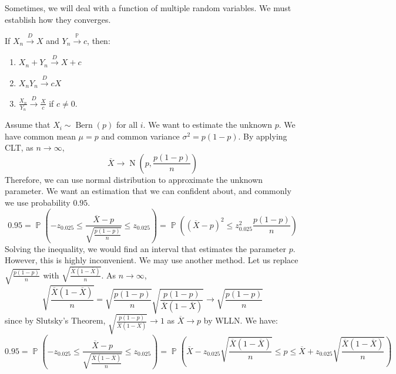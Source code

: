 \documentclass{huhtakm-template-book-v2}
\DeclareMathOperator{\prob}{\mathbb{P}}
\DeclareMathOperator{\Bern}{Bern}
\DeclareMathOperator{\N}{N}
\begin{document}
\newpage
Sometimes, we will deal with a function of multiple random variables. We must establish how they converges.
\begin{thm}
	If $X_{n}\xrightarrow{D}X$ and $Y_{n}\xrightarrow{\prob}c$, then:
	\begin{enumerate}
		\item $X_{n}+Y_{n}\xrightarrow{D}X+c$
		\item $X_{n}Y_{n}\xrightarrow{D}cX$
		\item $\frac{X_{n}}{Y_{n}}\xrightarrow{D}\frac{X}{c}$ if $c\neq 0$.
	\end{enumerate}
\end{thm}
\begin{eg}
	Assume that $X_{i}\sim\Bern(p)$ for all $i$. We want to estimate the unknown $p$. We have common mean $\mu=p$ and common variance $\sigma^{2}=p(1-p)$. By applying CLT, as $n\to\infty$,
	\begin{equation*}
		\overline{X}\to\N\left(p,\frac{p(1-p)}{n}\right)
	\end{equation*}
	Therefore, we can use normal distribution to approximate the unknown parameter. We want an estimation that we can confident about, and commonly we use probability $0.95$.
	\begin{equation*}
		0.95=\prob\left(-z_{0.025}\leq\frac{\overline{X}-p}{\sqrt{\frac{p(1-p)}{n}}}\leq z_{0.025}\right)=\prob\left((\overline{X}-p)^{2}\leq z_{0.025}^{2}\frac{p(1-p)}{n}\right)
	\end{equation*} 
	Solving the inequality, we would find an interval that estimates the parameter $p$. However, this is highly inconvenient. We may use another method. Let us replace $\sqrt{\frac{p(1-p)}{n}}$ with $\sqrt{\frac{\overline{X}(1-\overline{X})}{n}}$. As $n\to\infty$,
	\begin{equation*}
		\sqrt{\frac{\overline{X}(1-\overline{X})}{n}}=\sqrt{\frac{p(1-p)}{n}}\sqrt{\frac{p(1-p)}{\overline{X}(1-\overline{X})}}\to\sqrt{\frac{p(1-p)}{n}}
	\end{equation*}
	since by Slutsky's Theorem, $\sqrt{\frac{p(1-p)}{\overline{X}(1-\overline{X})}}\to 1$ as $\overline{X}\to p$ by WLLN. We have:
	\begin{equation*}
		0.95=\prob\left(-z_{0.025}\leq\frac{\overline{X}-p}{\sqrt{\frac{\overline{X}(1-\overline{X})}{n}}}\leq z_{0.025}\right)=\prob\left(\overline{X}-z_{0.025}\sqrt{\frac{\overline{X}(1-\overline{X})}{n}}\leq p\leq\overline{X}+z_{0.025}\sqrt{\frac{\overline{X}(1-\overline{X})}{n}}\right)
	\end{equation*} 
\end{eg}
\end{document}
